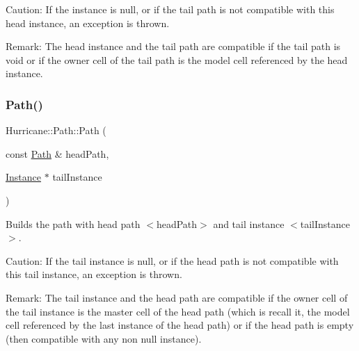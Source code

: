 \begin{DoxyParagraph}{Caution\+:}
If the instance is null, or if the tail path is not compatible with this head instance, an exception is thrown.
\end{DoxyParagraph}
\begin{DoxyParagraph}{Remark\+:}
The head instance and the tail path are compatible if the tail path is void or if the owner cell of the tail path is the model cell referenced by the head instance. 
\end{DoxyParagraph}
\mbox{\label{classHurricane_1_1Path_add5812ab3bb9a4cf6dbe49d1e4e932cb}} 
\subsubsection{\texorpdfstring{Path()}{Path()}\hspace{0.1cm}{\footnotesize\ttfamily [4/6]}}
{\footnotesize\ttfamily Hurricane\+::\+Path\+::\+Path (\begin{DoxyParamCaption}\item[{const \hyperlink{classHurricane_1_1Path}{Path} \&}]{head\+Path,  }\item[{\hyperlink{classHurricane_1_1Instance}{Instance} $\ast$}]{tail\+Instance }\end{DoxyParamCaption})}

Builds the path with head path {\ttfamily $<$head\+Path$>$} and tail instance {\ttfamily $<$tail\+Instance$>$}.

\begin{DoxyParagraph}{Caution\+:}
If the tail instance is null, or if the head path is not compatible with this tail instance, an exception is thrown.
\end{DoxyParagraph}
\begin{DoxyParagraph}{Remark\+:}
The tail instance and the head path are compatible if the owner cell of the tail instance is the master cell of the head path (which is recall it, the model cell referenced by the last instance of the head path) or if the head path is empty (then compatible with any non null instance). 
\end{DoxyParagraph}
\mbox{\label{classHurricane_1_1Path_a6e3d331f5c5a0dcb91d10516a4beb6bc}} 
